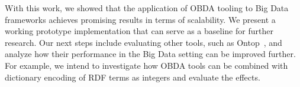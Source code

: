 With this work, we showed that the application of OBDA tooling to Big Data frameworks achieves promising results in terms of scalability. 
We present a working prototype implementation that can serve as a baseline for further research. 
Our next steps include evaluating other tools, such as Ontop~\cite{Calvanese2017OntopAS}, and analyze how their performance in the Big Data setting can be improved further. 
For example, we intend to investigate how OBDA tools can be combined with dictionary encoding of RDF terms as integers and evaluate the effects.



%
%



%

